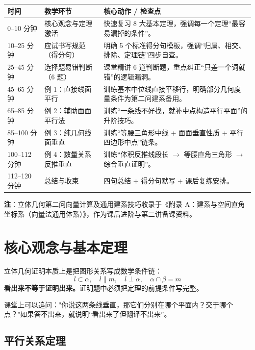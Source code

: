\documentclass[11pt,a4paper]{ctexart}
\providecommand{\teachblock}[2]{%
  \begin{tcolorbox}[enhanced,breakable,colback=white,colframe=rulecolor,
    boxrule=0.55pt,arc=1mm,left=1.4mm,right=1.4mm,top=1.1mm,bottom=1.1mm,
    title={#1},fonttitle=\bfseries]
  #2
  \end{tcolorbox}
}
\begin{document}
\vspace{0.4em}
\begin{tabularx}{\textwidth}{p{3.2cm}p{4.5cm}X}
\toprule
时间 & 教学环节 & 核心动作 / 检查点 \\
\midrule
0--10 分钟 & 核心观念与定理激活 & 快速复习 8 大基本定理，强调每一个定理“最容易漏掉的条件”。 \\ \hline
10--25 分钟 & 应试书写规范（得分句） & 明确 5 个标准得分句模板，强调“归属、相交、排除、定理链”四步自查。 \\ \hline
25--45 分钟 & 选择题易错判断（6 题） & 课堂精讲 6 道判断题，重点纠正“只差一个词就错”的逻辑漏洞。 \\ \hline
45--65 分钟 & 例 1：直接线面平行 & 训练基本中位线直接平移行，明确部分几何度量条件为第二问建系备用。 \\ \hline
65--85 分钟 & 例 2：辅助面面平行法 & 训练“一条线不好找，就补中点构造平行平面”的升阶技巧。 \\ \hline
85--100 分钟 & 例 3：纯几何线面垂直 & 训练“等腰三角形中线 + 面面垂直性质 + 平行四边形中点”链条。 \\ \hline
100--112 分钟 & 例 4：数量关系反推垂直 & 训练“体积反推线段长 $\to$ 等腰直角三角形 $\to$ 综合垂直证明”。 \\ \hline
112--120 分钟 & 总结与收束 & 四句总结 + 得分句默写 + 课后复练安排。 \\
\bottomrule
\end{tabularx}
\vspace{0.4em}
\textbf{注}：立体几何第二问向量计算及通用建系技巧收录于《附录 A：建系与空间直角坐标系（向量法通用体系）》，作为课后进阶与第二讲备课资料。

\section{核心观念与基本定理}

\teachblock{核心观念：立体几何不是"看图"，而是"翻译"}{
立体几何证明本质上是把图形关系写成数学条件链：
\[
  l\subset\alpha,\quad l\parallel m,\quad l\perp\alpha,\quad \alpha\cap\beta=m
\]
\textbf{看出来不等于证明出来。}证明题中必须把定理的前提条件写完整。

课堂上可以追问："你说这两条线垂直，那它们分别在哪个平面内？交于哪个点？"如果答不出来，就说明“看出来了但翻译不出来”。
}

\subsection{平行关系定理}
\end{document}
